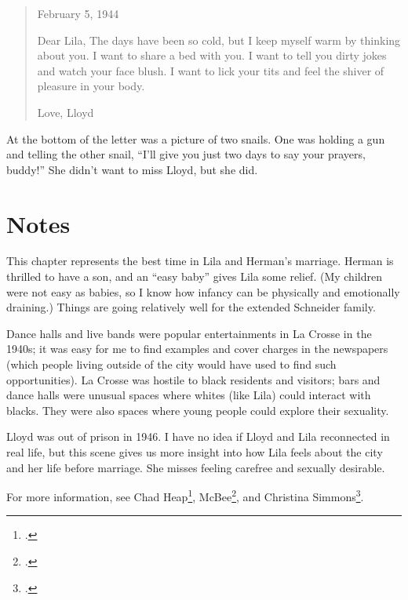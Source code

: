 \documentclass[
  letterpaper,
]{book}
\begin{document}
\begin{quote}
February 5, 1944

Dear Lila, The days have been so cold, but I keep myself warm by
thinking about you. I want to share a bed with you. I want to tell you
dirty jokes and watch your face blush. I want to lick your tits and feel
the shiver of pleasure in your body.

Love, Lloyd
\end{quote}

At the bottom of the letter was a picture of two snails. One was holding
a gun and telling the other snail, ``I'll give you just two days to say
your prayers, buddy!'' She didn't want to miss Lloyd, but she did.

\section{Notes}\label{notes-40}

This chapter represents the best time in Lila and Herman's marriage.
Herman is thrilled to have a son, and an ``easy baby'' gives Lila some
relief. (My children were not easy as babies, so I know how infancy can
be physically and emotionally draining.) Things are going relatively
well for the extended Schneider family.

Dance halls and live bands were popular entertainments in La Crosse in
the 1940s; it was easy for me to find examples and cover charges in the
newspapers (which people living outside of the city would have used to
find such opportunities). La Crosse was hostile to black residents and
visitors; bars and dance halls were unusual spaces where whites (like
Lila) could interact with blacks. They were also spaces where young
people could explore their sexuality.

Lloyd was out of prison in 1946. I have no idea if Lloyd and Lila
reconnected in real life, but this scene gives us more insight into how
Lila feels about the city and her life before marriage. She misses
feeling carefree and sexually desirable.

For more information, see Chad Heap\footnote{.}, McBee\footnote{.}, and Christina Simmons\footnote{.}.
\end{document}
